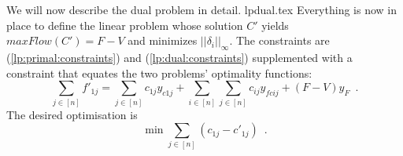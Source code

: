 \documentclass[11pt]{llncs}
\begin{document}
  We will now describe the dual problem in detail.
  {lpdual.tex}
  Everything is now in place to define the linear problem whose solution $C'$ yields $maxFlow\left(C'\right) = F - V$ and
  minimizes $||\delta_i||_\infty$. The constraints are (\ref{lp:primal:constraints}) and (\ref{lp:dual:constraints})
  supplemented with a constraint that equates the two problems' optimality functions:
  \begin{equation*}
    \sum\limits_{j \in \left[n\right]}f'_{1j} = \sum\limits_{j \in \left[n\right]}c_{1j}y_{c1j} +
    \sum\limits_{i \in \left[n\right]}\sum\limits_{j \in \left[n\right]}c_{ij}y_{fcij} + \left(F - V\right)y_F \enspace.
  \end{equation*}
  The desired optimisation is
  \begin{equation*}
    \min{\sum\limits_{j \in \left[n\right]}\left(c_{1j} - c'_{1j}\right)} \enspace.
  \end{equation*}
\end{document}
